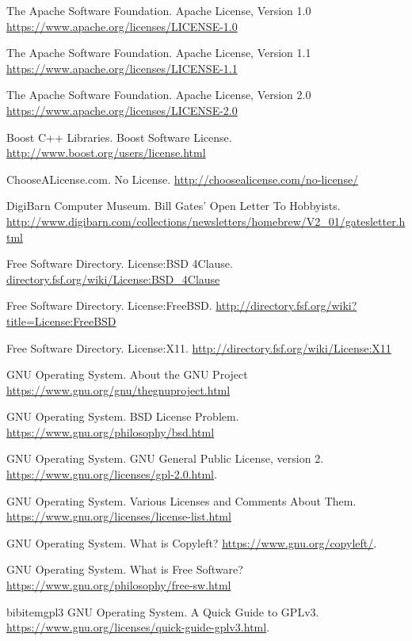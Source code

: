 \documentclass[12pt,letterpaper]{article}
\begin{document}
\begin{thebibliography}{20}

 The Apache Software Foundation. Apache License, Version 1.0 \url{https://www.apache.org/licenses/LICENSE-1.0}

 The Apache Software Foundation. Apache License, Version 1.1 \url{https://www.apache.org/licenses/LICENSE-1.1}

 The Apache Software Foundation. Apache License, Version 2.0 \url{https://www.apache.org/licenses/LICENSE-2.0}

 Boost C++ Libraries. Boost Software License. \url{http://www.boost.org/users/license.html}

 ChooseALicense.com. No License. \url{http://choosealicense.com/no-license/}

 DigiBarn Computer Museum. Bill Gates' Open Letter To Hobbyists. \url{http://www.digibarn.com/collections/newsletters/homebrew/V2_01/gatesletter.html}

 Free Software Directory. License:BSD 4Clause. \url{directory.fsf.org/wiki/License:BSD_4Clause}

 Free Software Directory. License:FreeBSD. \url{http://directory.fsf.org/wiki?title=License:FreeBSD}

 Free Software Directory. License:X11. \url{http://directory.fsf.org/wiki/License:X11}

 GNU Operating System. About the GNU Project \url{https://www.gnu.org/gnu/thegnuproject.html}

 GNU Operating System. BSD License Problem. \url{https://www.gnu.org/philosophy/bsd.html}

 GNU Operating System. GNU General Public License, version 2. \url{https://www.gnu.org/licenses/gpl-2.0.html}.

 GNU Operating System. Various Licenses and Comments About Them. \url{https://www.gnu.org/licenses/license-list.html}

 GNU Operating System. What is Copyleft? \url{https://www.gnu.org/copyleft/}.

 GNU Operating System. What is Free Software? \url{https://www.gnu.org/philosophy/free-sw.html}

bibitem{gpl3} GNU Operating System. A Quick Guide to GPLv3. \url{https://www.gnu.org/licenses/quick-guide-gplv3.html}.


\end{thebibliography}
\end{document}
